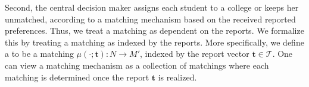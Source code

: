 \documentclass[12pt, fullpage]{amsart}
\theoremstyle{definition}
\theoremstyle{definition}
\theoremstyle{definition}
\begin{document}
\begin{bibunit}[econometrica]





Second, the central decision maker assigns each student to a college or keeps her unmatched, according to a matching mechanism based on the received reported preferences. Thus, we treat a matching as dependent on the reports. We formalize this by treating a matching as indexed by the reports. More specifically, we define a  to be a matching $\mu(\cdot;\boldsymbol{t}): N \rightarrow M'$, indexed by the report vector $\boldsymbol{t} \in \mathcal{T}$. One can view a matching mechanism as a collection of matchings where each matching is determined once the report $\boldsymbol{t}$ is realized.


\end{bibunit}
\end{document}

